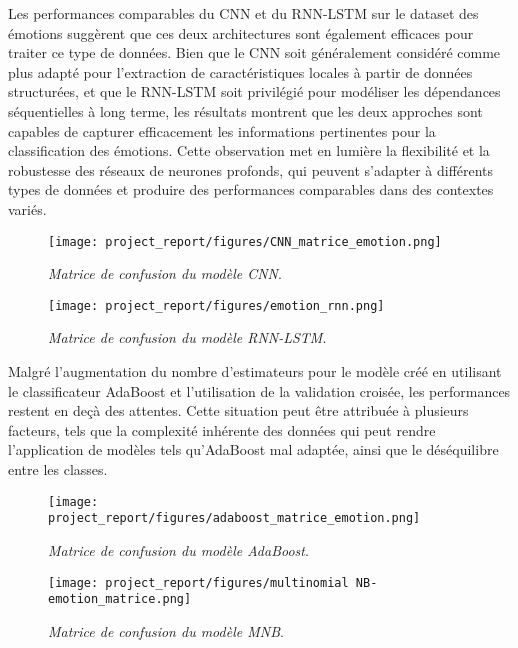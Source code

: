 Les performances comparables du CNN et du RNN-LSTM sur le dataset des émotions suggèrent que ces deux architectures sont également efficaces pour traiter ce type de données. Bien que le CNN soit généralement considéré comme plus adapté pour l'extraction de caractéristiques locales à partir de données structurées, et que le RNN-LSTM soit privilégié pour modéliser les dépendances séquentielles à long terme, les résultats montrent que les deux approches sont capables de capturer efficacement les informations pertinentes pour la classification des émotions. Cette observation met en lumière la flexibilité et la robustesse des réseaux de neurones profonds, qui peuvent s'adapter à différents types de données et produire des performances comparables dans des contextes variés.\par
\begin{figure}[h]
    \centering
    \begin{minipage}{0.45\textwidth}
        \centering
        \texttt{[image: project\_report/figures/CNN\_matrice\_emotion.png]}
        \caption{\textit{Matrice de confusion du modèle CNN}.}
        \label{fig:figureCNN}
    \end{minipage}\hfill
    \begin{minipage}{0.45\textwidth}
        \centering
        \texttt{[image: project\_report/figures/emotion\_rnn.png]}
        \caption{\textit{Matrice de confusion du modèle RNN-LSTM}.}
        \label{fig:figureLSTM}
    \end{minipage}
\end{figure} 



Malgré l'augmentation du nombre d'estimateurs pour le modèle créé en utilisant le classificateur AdaBoost et l'utilisation de la validation croisée, les performances restent en deçà des attentes.
Cette situation peut être attribuée à plusieurs facteurs, tels que la complexité inhérente des données qui peut rendre l'application de modèles tels qu'AdaBoost mal adaptée, ainsi que le déséquilibre entre les classes.

\begin{figure}[h]
    \centering
    \begin{minipage}{0.45\textwidth}
        \centering
        \texttt{[image: project\_report/figures/adaboost\_matrice\_emotion.png]}
        \caption{\textit{Matrice de confusion du modèle AdaBoost}.}
        \label{fig:figureSHJJJR}
    \end{minipage}\hfill
    \begin{minipage}{0.45\textwidth}
        \centering
        \texttt{[image: project\_report/figures/multinomial NB-emotion\_matrice.png]}
        \caption{\textit{Matrice de confusion du modèle MNB}.}
        \label{fig:figureNBVV}
    \end{minipage}
\end{figure} 



